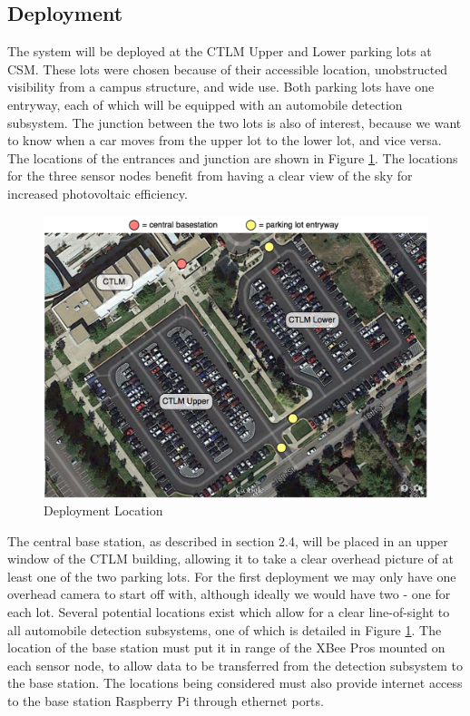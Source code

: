 \documentclass[11pt, oneside, fullpage, doublespace]{article}
\begin{document}
\subsection{Deployment}
The system will be deployed at the CTLM Upper and Lower parking lots at CSM. These lots were chosen because of their accessible location, unobstructed visibility from a campus structure, and wide use. Both parking lots have one entryway, each of which will be equipped with an automobile detection subsystem. The junction between the two lots is also of interest, because we want to know when a car moves from the upper lot to the lower lot, and vice versa. The locations of the entrances and junction are shown in Figure \ref{fig:deployment}. The locations for the three sensor nodes benefit from having a clear view of the sky for increased photovoltaic efficiency.
\begin{figure}
\begin{center}
\includegraphics[width=5in]{deployment}
\end{center}
\caption{Deployment Location}
\label{fig:deployment}
\end{figure}

The central base station, as described in section 2.4, will be placed in an upper window of the CTLM building, allowing it to take a clear overhead picture of at least one of the two parking lots. For the first deployment we may only have one overhead camera to start off with, although ideally we would have two - one for each lot. Several potential locations exist which allow for a clear line-of-sight to all automobile detection subsystems, one of which is detailed in Figure \ref{fig:deployment}. The location of the base station must put it in range of the XBee Pros mounted on each sensor node, to allow data to be transferred from the detection subsystem to the base station. The locations being considered must also provide internet access to the base station Raspberry Pi through ethernet ports.
\end{document}
